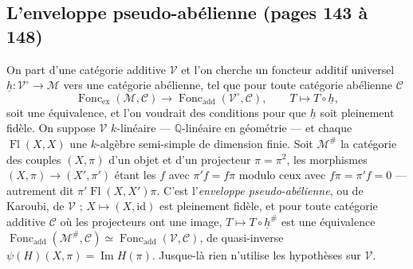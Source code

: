 \documentclass[11pt,a4paper]{article}
\begin{document}
\subsection*{L'enveloppe pseudo-abélienne (pages 143 à 148)}

On part d'une catégorie additive $\mathcal{V}$ et l'on cherche un foncteur additif
universel $\underline{h} \colon \mathcal{V}^{\circ} \to \mathcal{M}$ vers une
catégorie abélienne, tel que pour toute catégorie abélienne $\mathcal{C}$
\[
\operatorname{Fonc}_{\mathrm{ex}}(\mathcal{M}, \mathcal{C}) \longrightarrow
\operatorname{Fonc}_{\mathrm{add}}(\mathcal{V}^{\circ}, \mathcal{C}) ,
\qquad T \longmapsto T \circ \underline{h} ,
\]
soit une équivalence, et l'on voudrait des conditions pour que $\underline{h}$ soit
pleinement fidèle. On suppose $\mathcal{V}$ $k$-linéaire --- $\mathbb{Q}$-linéaire en
géométrie --- et chaque $\operatorname{Fl}(X,X)$ une $k$-algèbre semi-simple de
dimension finie. Soit $\mathcal{M}^{\#}$ la catégorie des couples $(X, \pi)$ d'un
objet et d'un projecteur $\pi = \pi^{2}$, les morphismes $(X, \pi) \to (X', \pi')$
étant les $f$ avec $\pi' f = f\pi$ modulo ceux avec $f\pi = \pi' f = 0$ --- autrement
dit $\pi' \operatorname{Fl}(X, X') \pi$. C'est l'\emph{enveloppe pseudo-abélienne}, ou
de Karoubi, de $\mathcal{V}$ ; $X \mapsto (X, \mathrm{id})$ est pleinement fidèle,
et pour toute catégorie additive $\mathcal{C}$ où les projecteurs ont une image,
$T \mapsto T \circ \underline{h}^{\#}$ est une équivalence
$\operatorname{Fonc}_{\mathrm{add}}(\mathcal{M}^{\#}, \mathcal{C}) \simeq
\operatorname{Fonc}_{\mathrm{add}}(\mathcal{V}, \mathcal{C})$, de quasi-inverse
$\psi(H)(X, \pi) = \operatorname{Im} H(\pi)$. Jusque-là rien n'utilise les hypothèses
sur $\mathcal{V}$.
\end{document}
